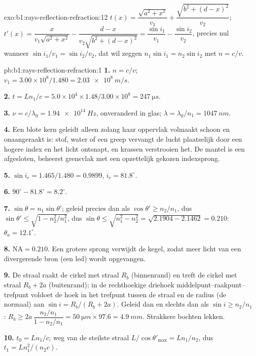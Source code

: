 \begin{solution}{exo:b1:rays-reflection-refraction:12}
$t(x) = \dfrac{\sqrt{a^2 + x^2}}{v_1} + \dfrac{\sqrt{b^2 + (d - x)^2}}{v_2}$;
$t'(x) = \dfrac{x}{v_1\sqrt{a^2 + x^2}} - \dfrac{d - x}{v_2\sqrt{b^2 + (d - x)^2}}
= \dfrac{\sin i_1}{v_1} - \dfrac{\sin i_2}{v_2}$, precies nul wanneer
$\sin i_1/v_1 = \sin i_2/v_2$, dat wil zeggen $n_1\sin i_1 = n_2\sin i_2$ met
$n = c/v$.
\end{solution}

\begin{solution}{pb:b1:rays-reflection-refraction:1}
\textbf{1.} $n = c/v$; $v_1 = 3.00\times10^8/1.480 = \qty{2.03e8}{m/s}$.

\textbf{2.} $t = Ln_1/c = 5.0\times10^4 \times 1.48/3.00\times10^8 =
\qty{247}{\micro s}$.

\textbf{3.} $\nu = c/\lambda_0 = \qty{1.94e14}{Hz}$, onveranderd in glas;
$\lambda = \lambda_0/n_1 = \qty{1047}{nm}$.

\textbf{4.} Een blote kern geleidt alleen zolang haar oppervlak volmaakt
schoon en onaangeraakt is: stof, water of een greep vervangt de lucht
plaatselijk door een hogere index en het licht ontsnapt, en krassen
verstrooien het. De mantel is een afgesloten, beheerst grensvlak met een
opzettelijk gekozen indexsprong.

\textbf{5.} $\sin i_c = 1.465/1.480 = 0.9899$, $i_c = 81.8^\circ$.

\textbf{6.} $90^\circ - 81.8^\circ = 8.2^\circ$.

\textbf{7.} $\sin\theta = n_1\sin\theta'$; geleid precies dan als $\cos\theta' \geq
n_2/n_1$, dus $\sin\theta' \leq \sqrt{1 - n_2^2/n_1^2}$, dus
$\sin\theta \leq \sqrt{n_1^2 - n_2^2} = \sqrt{2.1904 - 2.1462} = 0.210$:
$\theta_a = 12.1^\circ$.

\textbf{8.} $\mathrm{NA} = 0.210$. Een grotere sprong verwijdt de kegel,
zodat meer licht van een divergerende bron (een led) wordt opgevangen.

\textbf{9.} De straal raakt de cirkel met straal $R_b$ (binnenrand) en
treft de cirkel met straal $R_b + 2a$ (buitenrand); in de rechthoekige
driehoek middelpunt--raakpunt--trefpunt voldoet de hoek in het trefpunt
tussen de straal en de radius (de normaal) aan
$\sin i = R_b/(R_b + 2a)$. Geleid dan en slechts dan als $\sin i \geq n_2/n_1$:
$R_b \geq 2a\,\dfrac{n_2/n_1}{1 - n_2/n_1} = \qty{50}{\micro m} \times 97.6
= \qty{4.9}{mm}$. Strakkere bochten lekken.

\textbf{10.} $t_0 = Ln_1/c$; weg van de steilste straal $L/\cos\theta'_{\max} =
Ln_1/n_2$, dus $t_1 = Ln_1^2/(n_2 c)$.


\end{solution}
